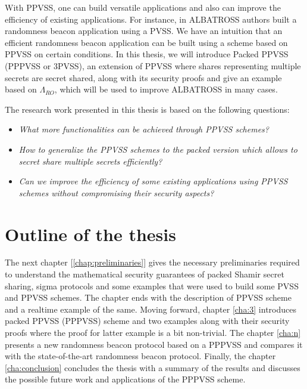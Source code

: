 With PPVSS, one can build versatile applications and also can improve the efficiency of existing 
applications. For instance, in ALBATROSS \cite{cryptoeprint:2020/644} authors built a randomness beacon application 
using a PVSS. We have an intuition that an efficient randomness beacon application can be built 
using a scheme based on PPVSS on certain conditions. In this thesis, we will introduce Packed PPVSS (PPPVSS or 3PVSS), 
an extension of PPVSS where shares representing multiple secrets are secret shared,  
along with its security proofs and give an example based on $\Lambda_{RO}$, which will be used to improve 
ALBATROSS in many cases.\par

The research work presented in this thesis is based on the following questions:
\begin{itemize}
    \item \textit{What more functionalities can be achieved through PPVSS schemes?}
    \item \textit{How to generalize the PPVSS schemes to the packed version which allows to 
      secret share multiple secrets efficiently?}
    \item \textit{Can we improve the efficiency of some existing applications using PPVSS schemes
      without compromising their security aspects?}
\end{itemize}


\section*{Outline of the thesis}
The next chapter [\ref{chap:preliminaries}] gives the necessary preliminaries required 
to understand the mathematical security guarantees of packed Shamir secret sharing, sigma 
protocols and some examples that were used to build some PVSS and PPVSS schemes. The chapter 
ends with the description of PPVSS scheme and a realtime example of the same. Moving forward, 
chapter \ref{cha:3} introduces packed PPVSS (PPPVSS) scheme and two examples along with 
their security proofs where the proof for latter example is a bit non-trivial. The 
chapter \ref{cha:n} presents a new randomness beacon protocol based on a PPPVSS and 
compares it with the state-of-the-art randomness beacon protocol.
Finally, the chapter \ref{cha:conclusion} concludes the thesis with a summary of the 
results and discusses the possible future work and applications of the PPPVSS scheme.


